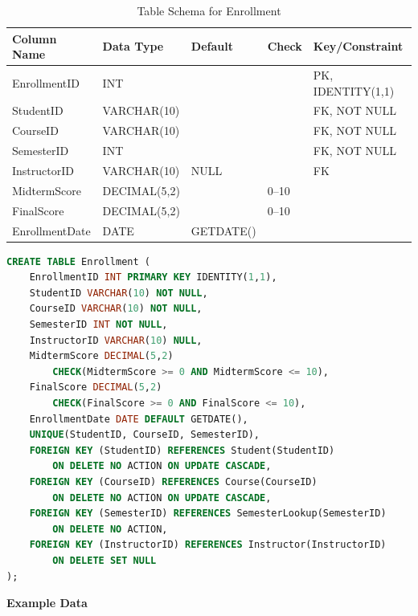 \documentclass[12pt,a4paper]{report}
\begin{document}
\begin{table}[ht]
\centering
\small
\begin{tabular}{|l|l|l|l|l|}
\hline
\textbf{Column Name} & \textbf{Data Type} & \textbf{Default} & \textbf{Check} & \textbf{Key/Constraint} \\ \hline
EnrollmentID & INT & & & PK, IDENTITY(1,1) \\ \hline
StudentID & VARCHAR(10) & & & FK, NOT NULL \\ \hline
CourseID & VARCHAR(10) & & & FK, NOT NULL \\ \hline
SemesterID & INT & & & FK, NOT NULL \\ \hline
InstructorID & VARCHAR(10) & NULL & & FK \\ \hline
MidtermScore & DECIMAL(5,2) & & 0--10 & \\ \hline
FinalScore & DECIMAL(5,2) & & 0--10 & \\ \hline
EnrollmentDate & DATE & GETDATE() & & \\ \hline
\end{tabular}
\caption{Table Schema for Enrollment}
\label{tab:enrollment_schema}
\end{table}

\vspace{0.3cm}

\begin{lstlisting}[language=SQL, caption=Create Table Enrollment]
CREATE TABLE Enrollment (
    EnrollmentID INT PRIMARY KEY IDENTITY(1,1),
    StudentID VARCHAR(10) NOT NULL,
    CourseID VARCHAR(10) NOT NULL,
    SemesterID INT NOT NULL,
    InstructorID VARCHAR(10) NULL,
    MidtermScore DECIMAL(5,2) 
        CHECK(MidtermScore >= 0 AND MidtermScore <= 10),
    FinalScore DECIMAL(5,2) 
        CHECK(FinalScore >= 0 AND FinalScore <= 10),
    EnrollmentDate DATE DEFAULT GETDATE(),
    UNIQUE(StudentID, CourseID, SemesterID),
    FOREIGN KEY (StudentID) REFERENCES Student(StudentID) 
        ON DELETE NO ACTION ON UPDATE CASCADE,
    FOREIGN KEY (CourseID) REFERENCES Course(CourseID) 
        ON DELETE NO ACTION ON UPDATE CASCADE,
    FOREIGN KEY (SemesterID) REFERENCES SemesterLookup(SemesterID)
        ON DELETE NO ACTION,
    FOREIGN KEY (InstructorID) REFERENCES Instructor(InstructorID)
        ON DELETE SET NULL
);
\end{lstlisting}

\textbf{Example Data}
\end{document}
